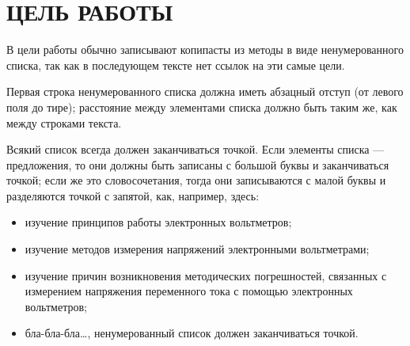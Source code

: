 \section{ЦЕЛЬ РАБОТЫ}

В цели работы обычно записывают копипасты из методы в виде ненумерованного списка,
так как в последующем тексте нет ссылок на эти самые цели.

Первая строка ненумерованного списка должна иметь абзацный отступ (от левого поля до тире); 
расстояние между элементами списка должно быть таким же, как между строками текста.

Всякий список всегда должен заканчиваться точкой. Если элементы списка --- 
предложения, то они должны быть записаны с большой буквы и заканчиваться точкой; если же это 
словосочетания, тогда они записываются с малой буквы и разделяются точкой с запятой, как, например, здесь: 

\begin{itemize} 
\item изучение принципов работы электронных вольтметров;
\item изучение методов измерения напряжений электронными вольтметрами;
\item изучение причин возникновения методических погрешностей, связанных с измерением напряжения переменного тока с помощью электронных вольтметров;
\item бла-бла-бла\dots, ненумерованный список должен заканчиваться точкой.
\end{itemize}

\newpage